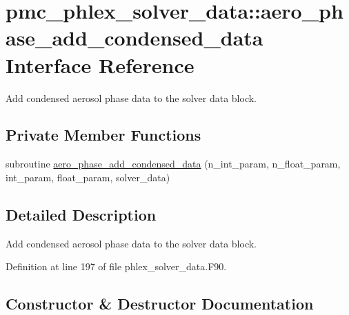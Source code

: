 \hypertarget{interfacepmc__phlex__solver__data_1_1aero__phase__add__condensed__data}{}\section{pmc\+\_\+phlex\+\_\+solver\+\_\+data\+:\+:aero\+\_\+phase\+\_\+add\+\_\+condensed\+\_\+data Interface Reference}
\label{interfacepmc__phlex__solver__data_1_1aero__phase__add__condensed__data}


Add condensed aerosol phase data to the solver data block.  


\subsection*{Private Member Functions}
\begin{DoxyCompactItemize}
\item 
subroutine \mbox{\hyperlink{interfacepmc__phlex__solver__data_1_1aero__phase__add__condensed__data_a046aab96a8916f2e7eb7405bc537e83e}{aero\+\_\+phase\+\_\+add\+\_\+condensed\+\_\+data}} (n\+\_\+int\+\_\+param, n\+\_\+float\+\_\+param, int\+\_\+param, float\+\_\+param, solver\+\_\+data)
\end{DoxyCompactItemize}


\subsection{Detailed Description}
Add condensed aerosol phase data to the solver data block. 

Definition at line 197 of file phlex\+\_\+solver\+\_\+data.\+F90.



\subsection{Constructor \& Destructor Documentation}
\mbox{\label{interfacepmc__phlex__solver__data_1_1aero__phase__add__condensed__data_a046aab96a8916f2e7eb7405bc537e83e}} 
